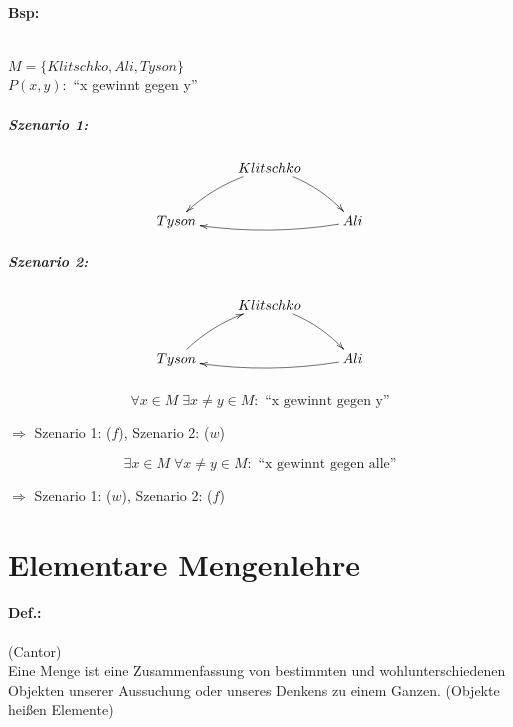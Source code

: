 \documentclass[11pt,a4paper,oneside]{article}
\begin{document}
{\begin{enumerate}
  \end{enumerate}

\paragraph{Bsp:}\mbox{}\\
  \hangindent=0.5cm
  $M = \{Klitschko, Ali, Tyson\}$ \\
  $P(x,y):$ ``x gewinnt gegen y''


  \subparagraph{Szenario 1:}
    \begin{displaymath}
      \xymatrix{ & Klitschko \ar@/_/[dl] \ar@/^/[dr] & \\
                 Tyson & & Ali \ar@/^/[ll] }
    \end{displaymath}

  \subparagraph{Szenario 2:}
    \begin{displaymath}
      \xymatrix{ & Klitschko \ar@/^/[dr] & \\
                 Tyson \ar@/^/[ur] & & Ali \ar@/^/[ll] }
    \end{displaymath}


  \subparagraph{}
    \begin{displaymath}
      \forall x \in M \; \exists x \neq y \in M: \text{ ``x gewinnt gegen y''}
    \end{displaymath}
    \begin{center}
      $\Rightarrow$ Szenario 1: ($f$), Szenario 2: ($w$)\\[5pt]
    \end{center}

    \begin{displaymath}
      \exists x \in M \; \forall x \neq y \in M: \text{ ``x gewinnt gegen alle''}
    \end{displaymath}
    \begin{center}
      $\Rightarrow$ Szenario 1: ($w$), Szenario 2: ($f$)\\[5pt]
    \end{center}

\newpage

\section{Elementare Mengenlehre}

\paragraph{Def.:}(Cantor)\\
  Eine Menge ist eine Zusammenfassung von bestimmten und wohlunterschiedenen Objekten
  unserer Aussuchung oder unseres Denkens zu einem Ganzen. (Objekte heißen Elemente)

}
\end{document}
